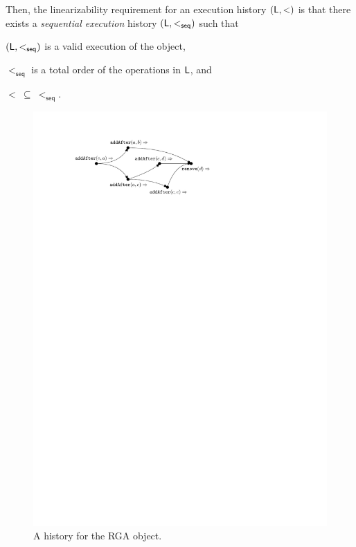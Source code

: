 Then, the linearizability requirement for an execution history
$(\mathsf{L}, <)$ is that there exists a \emph{sequential execution}
history $(\mathsf{L}, <_{\mathsf{seq}})$ such that
\begin{inparaenum}[(i)]
\item $(\mathsf{L}, <_{\mathsf{seq}})$ is a valid execution of the object,
\item $<_{\mathsf{seq}}$ is a total order of the operations in
  $\mathsf{L}$, and
\item $ <\ \subseteq\ <_{\mathsf{seq}}$.
\end{inparaenum}

\begin{figure}
  \includegraphics[scale=.8]{figures/history-RGA}
  \caption{A history for the RGA object.}
  \label{fig:rga-history}
\end{figure}

